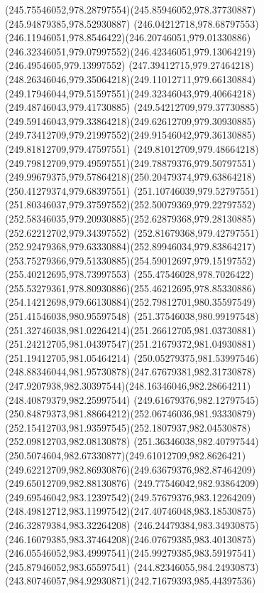 {    \curveto(245.75546052,978.28797554)(245.85946052,978.37730887)(245.94879385,978.52930887)
    \curveto(246.04212718,978.68797553)(246.11946051,978.8546422)(246.20746051,979.01330886)
    \curveto(246.32346051,979.07997552)(246.42346051,979.13064219)(246.4954605,979.13997552)
    \curveto(247.39412715,979.27464218)(248.26346046,979.35064218)(249.11012711,979.66130884)
    \curveto(249.17946044,979.51597551)(249.32346043,979.40664218)(249.48746043,979.41730885)
    \curveto(249.54212709,979.37730885)(249.59146043,979.33864218)(249.62612709,979.30930885)
    \curveto(249.73412709,979.21997552)(249.91546042,979.36130885)(249.81812709,979.47597551)
    \curveto(249.81012709,979.48664218)(249.79812709,979.49597551)(249.78879376,979.50797551)
    \curveto(249.99679375,979.57864218)(250.20479374,979.63864218)(250.41279374,979.68397551)
    \curveto(251.10746039,979.52797551)(251.80346037,979.37597552)(252.50079369,979.22797552)
    \curveto(252.58346035,979.20930885)(252.62879368,979.28130885)(252.62212702,979.34397552)
    \curveto(252.81679368,979.42797551)(252.92479368,979.63330884)(252.89946034,979.83864217)
    \curveto(253.75279366,979.51330885)(254.59012697,979.15197552)(255.40212695,978.73997553)
    \curveto(255.47546028,978.7026422)(255.53279361,978.80930886)(255.46212695,978.85330886)
    \curveto(254.14212698,979.66130884)(252.79812701,980.35597549)(251.41546038,980.95597548)
    \curveto(251.37546038,980.99197548)(251.32746038,981.02264214)(251.26612705,981.03730881)
    \curveto(251.24212705,981.04397547)(251.21679372,981.04930881)(251.19412705,981.05464214)
    \curveto(250.05279375,981.53997546)(248.88346044,981.95730878)(247.67679381,982.31730878)
    \curveto(247.9207938,982.30397544)(248.16346046,982.28664211)(248.40879379,982.25997544)
    \curveto(249.61679376,982.12797545)(250.84879373,981.88664212)(252.06746036,981.93330879)
    \curveto(252.15412703,981.93597545)(252.1807937,982.04530878)(252.09812703,982.08130878)
    \curveto(251.36346038,982.40797544)(250.5074604,982.67330877)(249.61012709,982.8626421)
    \curveto(249.62212709,982.86930876)(249.63679376,982.87464209)(249.65012709,982.88130876)
    \curveto(249.77546042,982.93864209)(249.69546042,983.12397542)(249.57679376,983.12264209)
    \curveto(248.49812712,983.11997542)(247.40746048,983.18530875)(246.32879384,983.32264208)
    \curveto(246.24479384,983.34930875)(246.16079385,983.37464208)(246.07679385,983.40130875)
    \curveto(246.05546052,983.49997541)(245.99279385,983.59197541)(245.87946052,983.65597541)
    \curveto(244.82346055,984.24930873)(243.80746057,984.92930871)(242.71679393,985.44397536)
}

